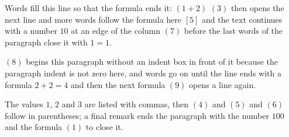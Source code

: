 \documentclass[11pt]{article}
\begin{document}
Words fill this line so that the formula ends it: $(1+2)$
$(3)$ then opens the next line and more words follow the formula here $[5]$
and the text continues with a number $10$ at an edge of the column $(7)$
before the last words of the paragraph close it with $1=1$.

$(8)$ begins this paragraph without an indent box in front of it because
the paragraph indent is not zero here, and words go on until the line ends
with a formula $2+2=4$ and then the next formula $(9)$ opens a line again.

The values $1$, $2$ and $3$ are listed with commas, then $(4)$ and $(5)$
and $(6)$ follow in parentheses; a final remark ends the paragraph with the
number $100$ and the formula $(1)$ to close it.
\end{document}

